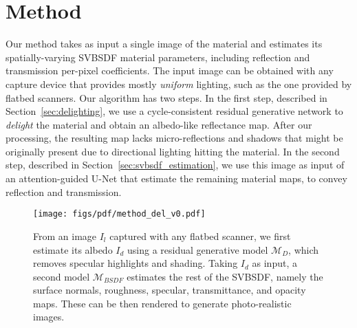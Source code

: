\section{Method}
\label{sec:method}

Our method takes as input a single image of the material and estimates its spatially-varying SVBSDF material parameters, including reflection and transmission per-pixel coefficients. 
The input image can be obtained with any capture device that provides mostly \textit{uniform} lighting, such as the one provided by flatbed scanners. %
Our algorithm has two steps. 
In the first step, described in Section~\ref{sec:delighting}, we use a  cycle-consistent residual generative network to \textit{delight} the material and obtain an albedo-like reflectance map. After our processing, the resulting map lacks micro-reflections and shadows that might be originally present due to directional lighting hitting the material.
In the second step, described in Section~\ref{sec:svbsdf_estimation}, we use this image as input of an attention-guided U-Net that estimate the remaining material maps, to convey reflection and transmission. 
\begin{figure*}[t!]
	\centering
	\texttt{[image: figs/pdf/method\_del\_v0.pdf]}
	\caption{From an image $I_{l}$ captured with any flatbed scanner, we first estimate its albedo $I_d$ using a residual generative model $\mathcal{M}_{D}$, which removes specular highlights and shading. Taking $I_d$ as input, a second model $\mathcal{M}_{BSDF}$ estimates the rest of the SVBSDF, namely the surface normals, roughness, specular, transmittance, and opacity maps. These can be then rendered to generate photo-realistic images.    }
	\label{fig:method}
\end{figure*}

